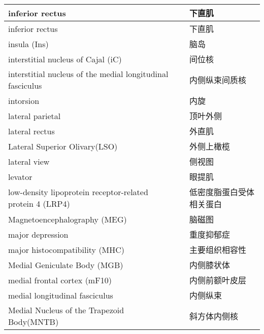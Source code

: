 \begin{longtable}{lll}
	\midrule
	inferior rectus   && 下直肌  \\
	
	\midrule
	inferior rectus   && 下直肌  \\
	
	\midrule
	insula (Ins)   && 脑岛  \\
	
	\midrule
	interstitial nucleus of Cajal (iC)   && 间位核  \\
	
	\midrule
	interstitial nucleus of the medial longitudinal fasciculus   && 内侧纵束间质核  \\
	
	\midrule
	intorsion   && 内旋  \\
	
	\midrule
	lateral parietal   && 顶叶外侧  \\
	
	\midrule
	lateral rectus   && 外直肌  \\
	
	\midrule
	Lateral Superior Olivary(LSO)   && 外侧上橄榄  \\
	
	\midrule
	lateral view   && 侧视图  \\
	
	\midrule
	levator   && 眼提肌  \\
	
	\midrule
	low-density lipoprotein receptor-related protein 4 (LRP4)   && 低密度脂蛋白受体相关蛋白  \\
		
	\midrule
	Magnetoencephalography (MEG)   && 脑磁图  \\
	
	\midrule
	major depression   && 重度抑郁症  \\
	
	\midrule
	major histocompatibility (MHC)   && 主要组织相容性  \\
	
	\midrule
	Medial Geniculate Body (MGB)   && 内侧膝状体  \\
	
	\midrule
	medial frontal cortex (mF10)   && 内侧前额叶皮层  \\
	
	\midrule
	medial longitudinal fasciculus   && 内侧纵束  \\
	
	\midrule
	Medial Nucleus of the Trapezoid Body(MNTB)   && 斜方体内侧核  \\
	

\end{longtable}
